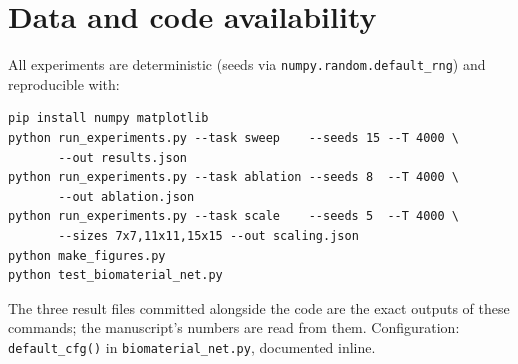 \documentclass[11pt]{article}
\begin{document}
\section{Data and code availability}
All experiments are deterministic (seeds via \texttt{numpy.random.default\_rng}) and
reproducible with:
\begin{verbatim}
pip install numpy matplotlib
python run_experiments.py --task sweep    --seeds 15 --T 4000 \
       --out results.json
python run_experiments.py --task ablation --seeds 8  --T 4000 \
       --out ablation.json
python run_experiments.py --task scale    --seeds 5  --T 4000 \
       --sizes 7x7,11x11,15x15 --out scaling.json
python make_figures.py
python test_biomaterial_net.py
\end{verbatim}
The three result files committed alongside the code are the exact outputs of these
commands; the manuscript's numbers are read from them. Configuration:
\texttt{default\_cfg()} in \texttt{biomaterial\_net.py}, documented inline.
\end{document}
